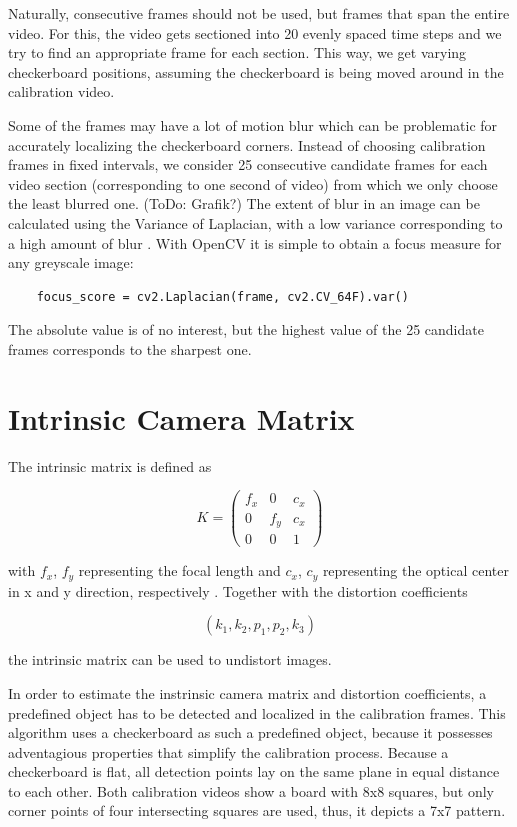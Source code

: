 \documentclass[bibliography=totoc]{scrartcl}
\begin{document}
Naturally, consecutive frames should not be used, but frames that span the entire video.
For this, the video gets sectioned into 20 evenly spaced time steps and we try to find an appropriate frame for each section.
This way, we get varying checkerboard positions, assuming the checkerboard is being moved around in the calibration video.

Some of the frames may have a lot of motion blur which can be problematic for accurately localizing the checkerboard corners.
Instead of choosing calibration frames in fixed intervals, we consider 25 consecutive candidate frames for each video section (corresponding to one second of video) from which we only choose the least blurred one. (ToDo: Grafik?)
The extent of blur in an image can be calculated using the Variance of Laplacian, with a low variance corresponding to a high amount of blur \cite{BlurDetection}.
With OpenCV it is simple to obtain a focus measure for any greyscale image:

\begin{lstlisting}
    focus_score = cv2.Laplacian(frame, cv2.CV_64F).var()
\end{lstlisting}

The absolute value is of no interest, but the highest value of the 25 candidate frames corresponds to the sharpest one.


\section{Intrinsic Camera Matrix}
The intrinsic matrix is defined as

$$
K =
\begin{pmatrix}
    f_x & 0 & c_x \\
    0 & f_y & c_x \\
    0 & 0 & 1
\end{pmatrix}
$$

with $f_x$, $f_y$ representing the focal length and $c_x$, $c_y$ representing the optical center in x and y direction, respectively \cite{CameraCalibration}.
Together with the distortion coefficients 

$$(k_1, k_2, p_1, p_2, k_3)$$

the intrinsic matrix can be used to undistort images.

In order to estimate the instrinsic camera matrix and distortion coefficients, a predefined object has to be detected and localized in the calibration frames.
This algorithm uses a checkerboard as such a predefined object, because it possesses adventagious properties that simplify the calibration process.
Because a checkerboard is flat, all detection points lay on the same plane in equal distance to each other.
Both calibration videos show a board with 8x8 squares, but only corner points of four intersecting squares are used, thus, it depicts a 7x7 pattern.
\end{document}
